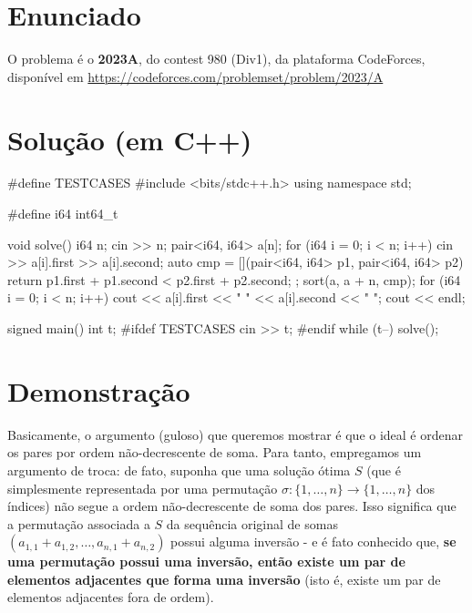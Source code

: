 \documentclass{article}
\begin{document}
\section{Enunciado}
O problema é o \textbf{2023A}, do contest 980 (Div1), da plataforma CodeForces, disponível em \url{https://codeforces.com/problemset/problem/2023/A}

\section{Solução (em C++)}

\begin{code}[C++]
    #define TESTCASES
    #include <bits/stdc++.h>
    using namespace std;
     
    #define i64 int64_t
     
    void solve(){
        i64 n;
        cin >> n;
        pair<i64, i64> a[n];
        for (i64 i = 0; i < n; i++){
            cin >> a[i].first >> a[i].second;
        }
        auto cmp = [](pair<i64, i64> p1, pair<i64, i64> p2){
            return p1.first + p1.second < p2.first + p2.second;
        };
        sort(a, a + n, cmp);
        for (i64 i = 0; i < n; i++){
            cout << a[i].first << " " << a[i].second << " ";
        }
        cout << endl;
    }
     
    signed main(){
        int t;
    #ifdef TESTCASES
        cin >> t;
    #endif
        while (t--){
            solve();
        }
    }
\end{code}  

\section{Demonstração}

Basicamente, o argumento (guloso) que queremos mostrar é que o ideal é ordenar os pares por ordem não-decrescente de soma.
Para tanto, empregamos um argumento de troca: de fato, suponha que uma solução ótima \(S\) (que é simplesmente representada por
uma permutação \(\sigma: \{1, \dotsc, n\} \to \{1, \dotsc, n\}\) dos índices) não segue a ordem não-decrescente de soma dos pares.
Isso significa que a permutação associada a \(S\) da sequência original de somas \((a_{1, 1} + a_{1, 2}, \dotsc, a_{n, 1} + a_{n, 2})\)
possui alguma inversão - e é fato conhecido que, \textbf{se uma permutação possui uma inversão, então existe um par de elementos
adjacentes que forma uma inversão} (isto é, existe um par de elementos adjacentes fora de ordem).
\end{document}
